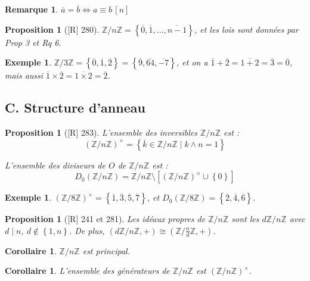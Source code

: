 \documentclass[10pt, a4paper, parskip=full, twoside, twocolumn]{report}
\newtheorem{proposition}[definition]{Proposition}
\newtheorem{corollary}[definition]{Corollaire}
\newtheorem{example}[definition]{Exemple}
\newtheorem{remark}[definition]{Remarque}
\newcommand{\IZ}{\mathbb{Z}}
\newcommand{\IZnZ}{\mathbb{Z}/n\mathbb{Z}}
\begin{document}
\begin{remark}
	$\overline{a} = \overline{b} \iff a\equiv b\,[n]$
\end{remark}

\begin{proposition}[\textnormal{[R] 280}]
	$\IZnZ = \left\{\overline{0},\overline{1},\dots,\overline{n-1}\right\}$, et les lois sont données par Prop 3 et Rq 6.
\end{proposition}

\begin{example}
	$\IZ/3\IZ = \left\{\overline{0},\overline{1},\overline{2}\right\} =\left\{\overline{9},\overline{64},\overline{-7}\right\}$,
	et on a $\overline{1}+\overline{2}=\overline{1+2}=\overline{3}=\overline{0}$, mais aussi $\overline{1}\times\overline{2} = \overline{1\times 2}=\overline{2}$.
\end{example}

\subsection*{C. Structure d'anneau}
\begin{proposition}[\textnormal{[R] 283}]
	L'ensemble des inversibles $\IZnZ$ est :
	$$\left(\IZnZ\right)^{\times} = \left\{\overline{k}\in\IZnZ\mid k\wedge n = 1\right\}$$

	L'ensemble des diviseurs de $O$ de $\IZnZ$ est :
	$$D_0\left(\IZnZ\right) = \IZnZ \setminus \left[\left(\IZnZ\right)^{\times}\cup \left\{0\right\}\right]$$
\end{proposition}

\begin{example}
	$\left(\IZ/8\IZ\right)^{\times} = \left\{\overline{1},\overline{3},\overline{5},\overline{7}\right\}$, et 
	$D_0\left(\IZ/8\IZ\right) = \left\{\overline{2},\overline{4},\overline{6}\right\}$.
\end{example}

\begin{proposition}[\textnormal{[R] 241 et 281}]
	Les idéaux propres de $\IZnZ$ sont les $d\IZnZ$ avec $d\mid n$, $d\notin \left\{1,n\right\}$.
	De plus, $\left(d\IZnZ, +\right)\cong \left(\IZ/\frac{n}{d}\IZ, +\right)$.
\end{proposition}

\begin{corollary}
	$\IZnZ$ est principal.
\end{corollary}

\begin{corollary}
	L'ensemble des générateurs de $\IZnZ$ est $\left(\IZnZ\right)^{\times}$.
\end{corollary}
\end{document}
